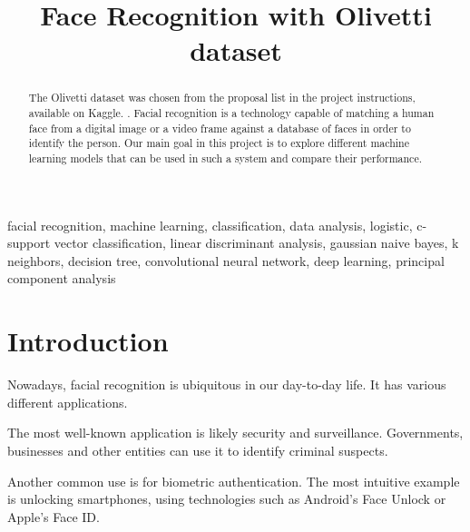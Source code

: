 \documentclass[conference]{IEEEtran}
\begin{document}
\title{Face Recognition with Olivetti dataset\\}

\author{
\and
{}
}

\maketitle
\thispagestyle{plain}
\pagestyle{plain}


\begin{abstract}
The Olivetti dataset was chosen from the proposal list in the project instructions, available on Kaggle. \cite{olivetti_dataset}. Facial recognition is a technology capable of matching a human face from a digital image or a video frame against a database of faces in order to identify the person.
Our main goal in this project is to explore different machine learning models that can be used in such a system and compare their performance.
\end{abstract}

\begin{IEEEkeywords}
facial recognition, machine learning, classification, data analysis, logistic, c-support vector classification, linear discriminant analysis, gaussian naive bayes, k neighbors, decision tree, convolutional neural network, deep learning, principal component analysis
\end{IEEEkeywords}

\section{Introduction}
Nowadays, facial recognition is ubiquitous in our day-to-day life. It has various different applications\cite{trio}.

The most well-known application is likely security and surveillance. Governments, businesses and other entities can use it to identify criminal suspects.

Another common use is for biometric authentication. The most intuitive example is unlocking smartphones, using technologies such as Android's Face Unlock or Apple's Face ID.
\end{document}
